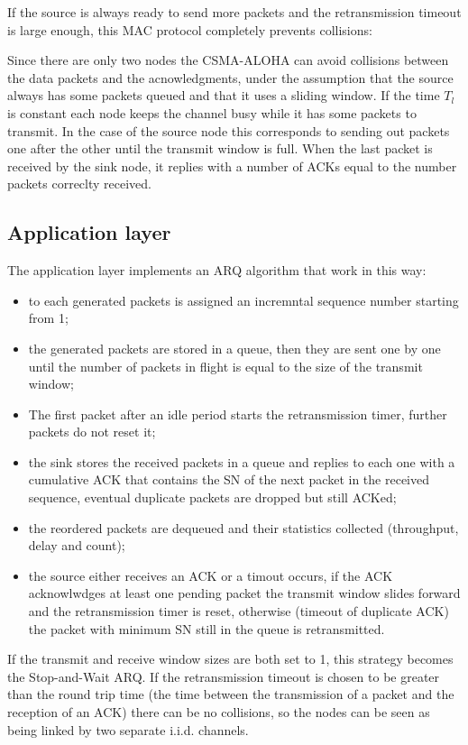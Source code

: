 If the source is always ready to send more packets and the
retransmission timeout is large enough, this MAC protocol completely
prevents collisions:

Since there are only two nodes the
CSMA-ALOHA can avoid collisions between the data packets and the
acnowledgments, under the assumption that the source always has some
packets queued and that it uses a sliding window. If the time $T_l$ is
constant each node keeps the channel busy while it has some packets to
transmit.
%
In the case of the source node this corresponds to sending out packets
one after the other until the transmit window is full. When the last
packet is received by the sink node, it replies with a number of ACKs
equal to the number packets correclty received.

\subsection{Application layer}
The application layer implements an ARQ algorithm that work in this
way:
\begin{itemize}
\item to each generated packets is assigned an incremntal sequence
  number starting from 1;
\item the generated packets are stored in a queue, then they are sent
  one by one until the number of packets in flight is equal to the
  size of the transmit window;
\item The first packet after an idle period starts the retransmission
  timer, further packets do not reset it;
\item the sink stores the received packets in a queue and replies to
  each one with a cumulative ACK that contains the SN of the next
  packet in the received sequence, eventual duplicate packets are
  dropped but still ACKed;
\item the reordered packets are dequeued and their statistics
  collected (throughput, delay and count);
\item the source either receives an ACK or a timout occurs, if the ACK
  acknowlwdges at least one pending packet the transmit window slides
  forward and the retransmission timer is reset, otherwise (timeout of
  duplicate ACK) the packet with minimum SN still in the queue is
  retransmitted.
\end{itemize}

If the transmit and receive window sizes are both set to 1, this
strategy becomes the Stop-and-Wait ARQ. If the retransmission timeout
is chosen to be greater than the round trip time (the time between the
transmission of a packet and the reception of an ACK) there can be no
collisions, so the nodes can be seen as being linked by two separate
i.i.d. channels.

